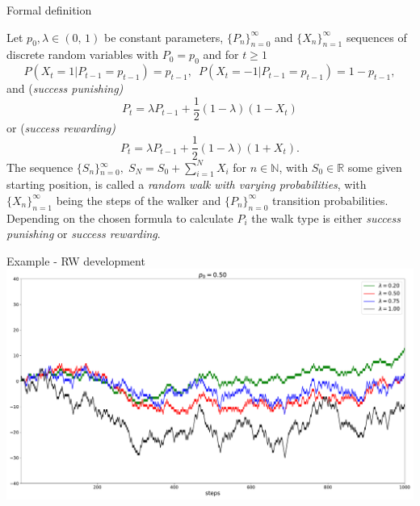 \documentclass[american]{beamer}
\begin{document}
    \begin{frame}{Formal definition}
        \begin{definition}
            Let $\ensuremath{p_{0},\lambda\in(0,\,1)}$\textrm{ be constant parameters,
                ${\{P_{n}\}}_{n=0}^{\infty}$ and ${\{X_{n}\}}_{n=1}^{\infty}$ sequences
                of discrete random variables with $P_{0}=p_{0}$ and for $t\ge1$
                \[
                    P(X_{t}=1|P_{t-1}=p_{t-1})=p_{t-1},\,\,\,P(X_{t}=-1|P_{t-1}=p_{t-1})=1-p_{t-1},
                \]
                and (}\emph{success punishing)}
            \[
                P_{t}=\lambda P_{t-1}+\frac{1}{2}(1-\lambda)(1-X_{t})
            \]
            or (\emph{success rewarding)
                \[
                    P_{t}=\lambda P_{t-1}+\frac{1}{2}(1-\lambda)(1+X_{t}).
                \]
            }The sequence ${\{S_{n}\}}{}_{n=0}^{\infty},\;S_{N}=S_{0}+\sum_{i=1}^{N}X_{i}$
            for $n\in\mathbb{N}$, with $S_{0}\in\mathbb{R}$ some given starting
            position, is called a \emph{random walk with varying probabilities},
            with ${\{X_{n}\}}_{n=1}^{\infty}$ being the steps of the walker and
            ${\{P_{n}\}}_{n=0}^{\infty}$ transition probabilities.
            Depending
            on the chosen formula to calculate $P_{i}$ the walk type is either
            \emph{success punishing} or \emph{success rewarding}.
        \end{definition}

    \end{frame}

    \begin{frame}{Example - RW development}
        \includegraphics[width=1\textwidth]{../../simulations/single_walk_1000_steps_type_success_punished}
    \end{frame}
\end{document}

